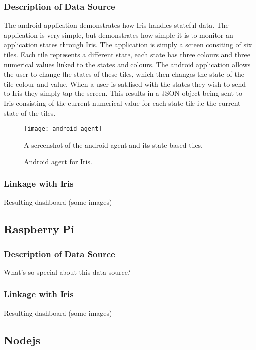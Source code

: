 \documentclass[12pt,a4paper,titlepage]{report}
\begin{document}
\subsubsection{Description of Data Source}
The android application demonstrates how Iris handles stateful data. The application is very simple, but demonstrates how simple it is to monitor an application states through Iris. The application is simply a screen consiting of six tiles. Each tile represents a different state, each state has three colours and three numerical values linked to the states and colours. The android application allows the user to change the states of these tiles, which then changes the state of the tile colour and value. When a user is satifised with the states they wish to send to Iris they simply tap the screen. This results in a JSON object being sent to Iris consisting of the current numerical value for each state tile i.e the current state of the tiles.
\begin{figure}[H]
\begin{tcolorbox}
\begin{center}
\texttt{[image: android-agent]}
\end{center}
A screenshot of the android agent and its state based tiles.
\end{tcolorbox}
\caption{Android agent for Iris.}
\end{figure}
\subsubsection{Linkage with Iris}
Resulting dashboard (some images)

\subsection{Raspberry Pi}
\subsubsection{Description of Data Source}
What's so special about this data source?
\subsubsection{Linkage with Iris}
Resulting dashboard (some images)

\subsection{Nodejs}
\end{document}
